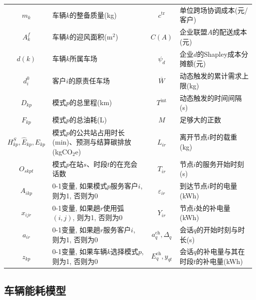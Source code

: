 \documentclass{setp-new}
\begin{document}
\begin{table}[H]
\begin{tabular*}{\linewidth}{@{\extracolsep{\fill}}cJcJ@{}}
$m_k$ & 车辆$k$的整备质量(kg) & $c^{\mathrm{tr}}$ & 单位跨场协调成本(元/客户)\\
$A_k^f$ & 车辆$k$的迎风面积(m$^2$) & $C(A)$ & 企业联盟$A$的配送成本(元)\\
$d(k)$ & 车辆$k$所属车场 & $\psi_d$ & 企业$d$的Shapley成本分摊额(元)\\
$d_i^0$ & 客户$i$的原责任车场 & $\overline W$ & 动态触发的累计需求上限(kg)\\
$D_{kp}$ & 模式$p$的总里程(km) & $T^{\mathrm{int}}$ & 动态触发的时间间隔(s)\\
$F_{kp}$ & 模式$p$的总油耗(L) & $M$ & 足够大的正数\\
$H_{kp}^{S},\widehat E_{kp},E_{kp}$ & 模式$p$的公共站占用时长(min)、预测与结算碳排放(kgCO$_2$e) & $L_{ir}$ & 离开节点$i$时的载重(kg)\\
$O_{skpt}$ & 模式$p$在站$s$、时段$t$的在充会话数 & $T_{ir}$ & 节点$i$的服务开始时刻(s)\\
$A_{ikp}$ & 0-1变量, 如果模式$p$服务客户$i$, 则为1, 否则为0 & $\varepsilon_{ir}$ & 到达节点$i$时的电量(kWh)\\
$x_{ijr}$ & 0-1变量, 如果趟$r$使用弧$(i,j)$, 则为1, 否则为0 & $Y_{ir}$ & 节点$i$处的补电量(kWh)\\
$a_{ir}$ & 0-1变量, 如果趟$r$服务客户$i$, 则为1, 否则为0 & $a_q^{\mathrm{ch}},\Delta_q$ & 会话$q$的开始时刻与时长(s)\\
$z_{kp}$ & 0-1变量, 如果车辆$k$选择模式$p$, 则为1, 否则为0 & $E_q^{\mathrm{ch}},y_{qt}$ & 会话$q$的补电量与其在时段$t$的补电量(kWh)\\
\bottomrule
\end{tabular*}
\end{table}

\subsection{车辆能耗模型}
\end{document}
